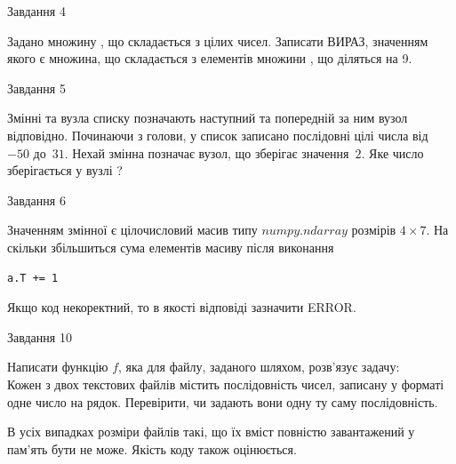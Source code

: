\documentclass[12pt, ukrainian]{article}
\begin{document}
{\begin{minipage}[t]{8.0cm}
\end{minipage}


               
{\begin{center}Завдання {4}\end{center}}
\vspace{-4mm}
Задано множину , що складається з цілих чисел. Записати ВИРАЗ, значенням якого є множина, що складається  з елементів множини , що діляться на 9.\par

\vspace{10mm}
               
{\begin{center}Завдання {5}\end{center}}
\vspace{-4mm}
Змінні  та  вузла списку позначають наступний та попередній за ним вузол відповідно. Починаючи з голови, у список записано послідовні цілі числа від~$-50$ до~$31$. Нехай змінна  позначає вузол, що зберігає значення~$2$.
Яке число зберігається у вузлі  ?\par

               
{\begin{center}Завдання {6}\end{center}}
\vspace{-4mm}
Значенням змінної  є цілочисловий масив типу $numpy.ndarray$ розмірів $4{\times}7$. На скільки збільшиться сума елементів масиву  після виконання
\begin{verbatim}
a.T += 1
\end{verbatim}


Якщо код некоректний, то в якості відповіді зазначити ERROR.\par

               
{\begin{center}Завдання {10}\end{center}}
\vspace{-4mm}

Написати функцію $f$, яка для файлу, заданого шляхом, розв’язує задачу:\\ Кожен з двох текстових файлів містить послідовність чисел, записану у форматі одне число на рядок.  Перевірити, чи задають вони одну ту саму послідовність.

В усіх випадках розміри файлів такі, що їх вміст повністю завантажений у пам'ять бути не може. Якість коду також оцінюється.



}
\end{document}
